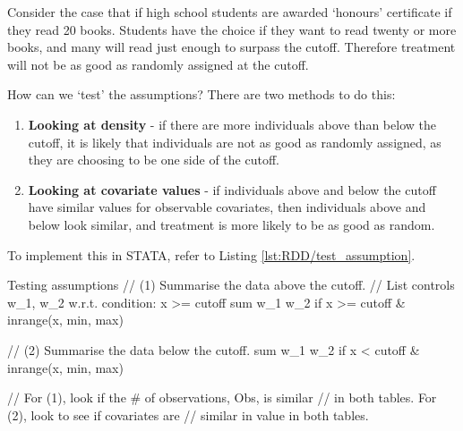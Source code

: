             \begin{example}
                Consider the case that if high school students are awarded `honours' certificate if they read 20 books. Students have the choice if they want to read twenty or more books, and many will read just enough to surpass the cutoff. Therefore treatment will not be as good as randomly assigned at the cutoff.
            \end{example}
            How can we `test' the assumptions? There are two methods to do this:
            \begin{enumerate}
                \item \textbf{Looking at density} - if there are more individuals above than below the cutoff, it is likely that individuals are not as good as randomly assigned, as they are choosing to be one side of the cutoff.
                \item \textbf{Looking at covariate values} - if individuals above and below the cutoff have similar values for observable covariates, then individuals above and below look similar, and treatment is more likely to be as good as random.
            \end{enumerate}
            To implement this in STATA, refer to Listing \ref{lst:RDD/test_assumption}.
            \begin{sexylisting}[colback=white, label=lst:RDD/test_assumption]{Testing assumptions}
//  (1) Summarise the data above the cutoff. 
//  List controls w_1, w_2 w.r.t. condition: x >= cutoff
    sum w_1 w_2 if x >= cutoff & inrange(x, min, max)
    
//  (2) Summarise the data below the cutoff.
    sum w_1 w_2 if x < cutoff & inrange(x, min, max)

//  For (1), look if the # of observations, Obs, is similar
//  in both tables. For (2), look to see if covariates are
//  similar in value in both tables.
            \end{sexylisting}

